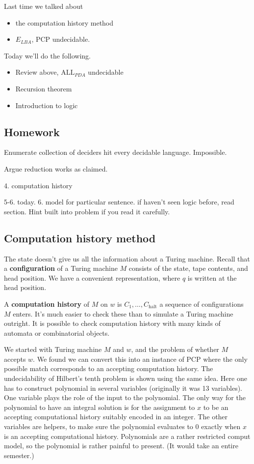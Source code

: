 
Last time we talked about
\begin{itemize}
\item
the computation history method
\item
$E_{LBA}$, PCP undecidable.
\end{itemize}
Today we'll do the following.
\begin{itemize}
\item
Review above, $\text{ALL}_{PDA}$ undecidable
\item
Recursion theorem
\item
Introduction to logic
\end{itemize}
\subsection*{Homework}
Enumerate collection of deciders hit every decidable language. Impossible.

Argue reduction works as claimed.

4. computation history

5-6. today. 6. model for particular sentence. if haven't seen logic before, read section. Hint built into problem if you read it carefully.

\subsection{Computation history method}
The state doesn't give us all the information about a Turing machine. 
Recall that a \textbf{configuration} of a Turing machine $M$ consists of the state, tape contents, and head position. We have a convenient representation, where $q$ is written at the head position.


A \textbf{computation history} of $M$ on $w$ is $C_1,\ldots, C_{\text{halt}}$ a sequence of configurations $M$ enters. %
It's much easier to check these than to simulate a Turing machine outright. It is possible to check computation history with many kinds of automata or combinatorial objects.


We started with Turing machine $M$ and $w$, and the problem of whether $M$ accepts $w$. We found we can convert this into an instance of PCP where the only possible match corresponds to an accepting computation history. The undecidability of Hilbert's tenth problem is shown using the same idea. %
Here one has to construct polynomial in several variables (originally it was 13 variables). One variable plays the role of the input to the polynomial. The only way for the polynomial to have an integral solution is for the assignment to $x$ to be an accepting computational history suitably encoded in an integer. The other variables are helpers, to make sure the polynomial evaluates to 0 exactly when $x$ is an accepting computational history. Polynomials are a rather restricted comput model, so the polynomial is rather painful to present. (It would take an entire semester.)

